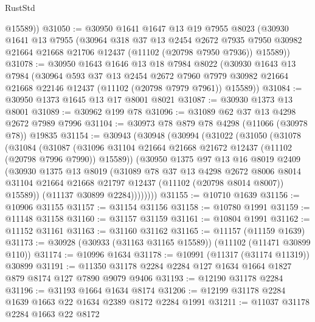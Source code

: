 \begin{lexlean}{RustStd}
\begin{coremodule}
        @15589))
@31050 := @30950
    @1641
    @1647
    @13
    @19
    @7955
    @8023
    (@30930
      @1641
      @13
      @7955
      (@30964
        @318
        @37
        @13
        @2454
        @2672
        @7935
        @7950
        @30982
        @21664
        @21668
        @21706
        @12437
        (@11102 (@20798 @7950 @7936))
        @15589))
@31078 := @30950
    @1643
    @1646
    @13
    @18
    @7984
    @8022
    (@30930
      @1643
      @13
      @7984
      (@30964
        @593
        @37
        @13
        @2454
        @2672
        @7960
        @7979
        @30982
        @21664
        @21668
        @22146
        @12437
        (@11102 (@20798 @7979 @7961))
        @15589))
@31084 := @30950 @1373 @1645 @13 @17 @8001 @8021
@31087 := @30930 @1373 @13 @8001
@31089 := @30962 @199 @78
@31096 := @31089 @62 @37 @13 @4298 @2672 @7989 @7996
@31104 := @30973 @78 @879 @78 @4298 (@11066 (@30978 @78)) @19835
@31154 := @30943
    (@30948
      (@30994
        (@31022
          (@31050
            (@31078
              (@31084
                (@31087
                  (@31096 @31104 @21664 @21668 @21672 @12437 (@11102 (@20798 @7996 @7990)) @15589))
                (@30950
                  @1375
                  @97
                  @13
                  @16
                  @8019
                  @2409
                  (@30930
                    @1375
                    @13
                    @8019
                    (@31089
                      @78
                      @37
                      @13
                      @4298
                      @2672
                      @8006
                      @8014
                      @31104
                      @21664
                      @21668
                      @21797
                      @12437
                      (@11102 (@20798 @8014 @8007))
                      @15589))
                  (@11137 @30899 @2284))))))))
@31155 := @10710 @1639
@31156 := @10906 @31155
@31157 := @31154 @31156
@31158 := @10780 @1991
@31159 := @11148 @31158
@31160 := @31157 @31159
@31161 := @10804 @1991
@31162 := @11152 @31161
@31163 := @31160 @31162
@31165 := @11157 (@11159 @1639)
@31173 := @30928 (@30933 (@31163 @31165 @15589)) (@11102 (@11471 @30899 @110))
@31174 := @10996 @1634
@31178 := @10991 (@11317 (@31174 @11319)) @30899
@31191 := @11350 @31178 @2284 @2284 @127 @1634 @1664 @1827 @879 @8174 @127 @7890 @9079 @9406
@31193 := @12190 @31178 @2284
@31196 := @31193 @1664 @1634 @8174
@31206 := @12199 @31178 @2284 @1639 @1663 @22 @1634 @2389 @8172 @2284 @1991
@31211 := @11037 @31178 @2284 @1663 @22 @8172

\end{coremodule}
\end{lexlean}
